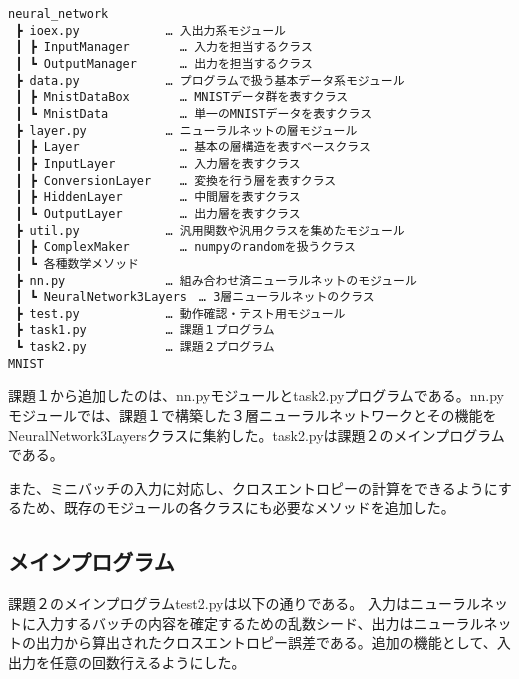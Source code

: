 \documentclass{ujarticle} %
\begin{document}
\begin{verbatim}
neural_network
 ┣ ioex.py            … 入出力系モジュール
 ┃ ┣ InputManager       … 入力を担当するクラス
 ┃ ┗ OutputManager      … 出力を担当するクラス
 ┣ data.py            … プログラムで扱う基本データ系モジュール
 ┃ ┣ MnistDataBox       … MNISTデータ群を表すクラス
 ┃ ┗ MnistData          … 単一のMNISTデータを表すクラス
 ┣ layer.py           … ニューラルネットの層モジュール
 ┃ ┣ Layer              … 基本の層構造を表すベースクラス
 ┃ ┣ InputLayer         … 入力層を表すクラス
 ┃ ┣ ConversionLayer    … 変換を行う層を表すクラス
 ┃ ┣ HiddenLayer        … 中間層を表すクラス
 ┃ ┗ OutputLayer        … 出力層を表すクラス
 ┣ util.py            … 汎用関数や汎用クラスを集めたモジュール
 ┃ ┣ ComplexMaker       … numpyのrandomを扱うクラス
 ┃ ┗ 各種数学メソッド
 ┣ nn.py              … 組み合わせ済ニューラルネットのモジュール
 ┃ ┗ NeuralNetwork3Layers　… 3層ニューラルネットのクラス
 ┣ test.py            … 動作確認・テスト用モジュール
 ┣ task1.py           … 課題１プログラム
 ┗ task2.py           … 課題２プログラム
MNIST
\end{verbatim}

課題１から追加したのは、nn.pyモジュールとtask2.pyプログラムである。nn.pyモジュールでは、課題１で構築した３層ニューラルネットワークとその機能をNeuralNetwork3Layersクラスに集約した。task2.pyは課題２のメインプログラムである。

また、ミニバッチの入力に対応し、クロスエントロピーの計算をできるようにするため、既存のモジュールの各クラスにも必要なメソッドを追加した。

\subsection{メインプログラム}

課題２のメインプログラムtest2.pyは以下の通りである。
入力はニューラルネットに入力するバッチの内容を確定するための乱数シード、出力はニューラルネットの出力から算出されたクロスエントロピー誤差である。追加の機能として、入出力を任意の回数行えるようにした。
\end{document}
